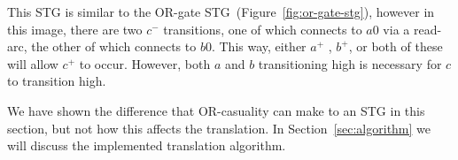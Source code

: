 \documentclass[british, journal]{IEEEtran}
\begin{document}
This STG is similar to the OR-gate STG~(Figure~\ref{fig:or-gate-stg}), however
in this image, there are two $c^{-}$ transitions, one of which connects to $a0$
via a read-arc, the other of which connects to $b0$. This way, either $a^{+}$ 
, $b^{+}$, or both of these will allow $c^{+}$ to occur. However, both $a$ and
$b$ transitioning high is necessary for $c$ to transition high. 

We have shown the difference that OR-casuality can make to an STG in this
section, but not how this affects the translation. In Section~\ref{sec:algorithm} we 
will discuss the implemented translation algorithm. 

%
%
%
%
\end{document}
